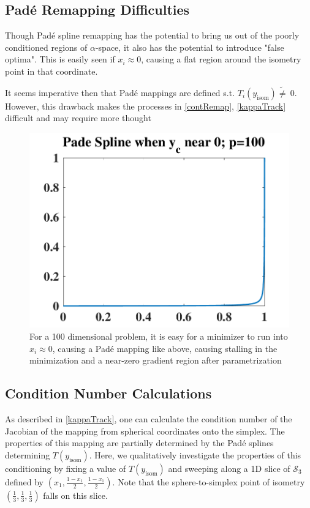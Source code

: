 \documentclass[10pt]{article}
\begin{document}
\subsection{Pad\'{e} Remapping Difficulties}

Though Pad\'{e} spline remapping has the potential to bring us out of the poorly conditioned regions of $\alpha$-space, it also has the potential to introduce "false optima". This is easily seen if $x_i \approx 0$, causing a flat region around the isometry point in that coordinate.

It seems imperative then that Pad\'{e} mappings are defined s.t. $T_i(y_\text{isom}) \tilde{\neq} \ 0$. However, this drawback makes the processes in \ref{contRemap}, \ref{kappaTrack} difficult and may require more thought

\begin{figure}[H]
	\centering
	\includegraphics[scale=0.4]{pinnedPade.pdf}
	\caption{For a 100 dimensional problem, it is easy for a minimizer to run into $x_i \approx 0$, causing a Pad\'{e} mapping like above, causing stalling in the minimization and a near-zero gradient region after parametrization}
\end{figure}

\subsection{Condition Number Calculations}

As described in \ref{kappaTrack}, one can calculate the condition number of the Jacobian of the mapping from spherical coordinates onto the simplex. The properties of this mapping are partially determined by the Pad\'{e} splines determining $T(y_\text{isom})$. Here, we qualitatively investigate the properties of this conditioning by fixing a value of $T(y_\text{isom})$ and sweeping along a 1D slice of $\mathcal{S}_3$ defined by $(x_1, \frac{1-x_1}{2}, \frac{1-x_1}{2})$. Note that the sphere-to-simplex point of isometry \big{(}$(\frac{1}{3},\frac{1}{3},\frac{1}{3})$\big{)} falls on this slice. \\
\end{document}
